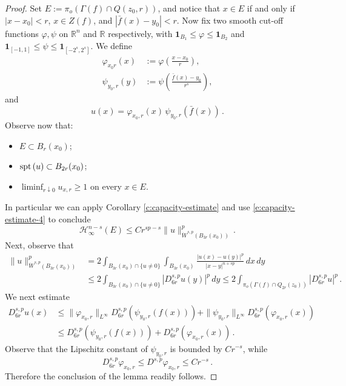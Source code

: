 \documentclass[11pt,reqno]{amsart}
\renewcommand{\H}{\mathcal{H}}
\theoremstyle{definition}
\numberwithin{equation}{section}
\begin{document}
\begin{proof}
Set $E:=\pi_o (\Gamma (f)\cap Q(z_0,r))$, and notice that $x\in E$ if and only if $|x-x_0|<r$, $x\in Z(f)$, and $|\bar{f}(x)-y_0|<r$. Now fix two smooth cut-off functions $\varphi, \psi$ on $\mathbb R^n$ and $\mathbb R$ respectively, with $\mathbf{1}_{B_1}\le\varphi\le \mathbf{1}_{B_2}$ and $\mathbf{1}_{[-1,1]} \le \psi \le\mathbf{1}_{[-2^s, 2^s]}$. We define 
\begin{align*}
\varphi_{x_0 r}(x) &:= \varphi \left(\frac{x-x_0}{r}\right),\\
\psi_{y_0,r} (y) &:= \psi \left(\frac{\bar{f}(x)-y_0}{r^s}\right),
\end{align*}
and 
\[
u(x) =\varphi_{x_0, r} (x)\, \psi_{y_0,r} (\bar{f} (x))\, .
\]
Observe now that:
\begin{itemize}
\item $E\subset B_r (x_0)$;
\item ${\rm spt}\, (u) \subset B_{2r} (x_0)$;
\item $\liminf_{r\downarrow 0} u_{x,r}\geq 1$ on every $x\in E$.
\end{itemize}
In particular we can apply Corollary \ref{c:capacity-estimate} and use \eqref{e:capacity-estimate-4} to conclude
\[
\H^{n-s}_\infty(E)\le Cr^{sp-s}\|u\|^p_{\dot{W}^{s,p}(B_{3r} (x_0))}\, .
\]
Next, observe that 
\begin{align*}
\|u\|^p_{\dot{W}^{s,p}(B_{3r}(x_0))} 
&= 2 \int_{B_{3r} (x_0) \cap \{u\neq 0\}} \int_{B_{3r} (x_0)} \frac{|u(x)-u(y)|^p}{|x-y|^{n+sp}}\, dx\, dy \\
&\leq 2 \int_{B_{3r} (x_0)\cap \{u\neq 0\}} |D^{s,p}_{6r} u (y)|^p\, dy 
\leq 2 \int_{\pi_o (\Gamma (f)\cap Q_{2r} (z_0))} |D^{s,p}_{6r} u|^p\, . 
\end{align*}
We next estimate
\begin{align*}
D^{s,p}_{6r}u(x) & \le \|\varphi_{x_0,r}\|_{L^\infty}D ^{s,p}_{6r} (\psi_{y_0,r}(f (x)))+\|\psi_{y_0,r}\|_{L^\infty} D^{s,p}_{6r}(\varphi_{x_0,r}(x))\\
& \le D^{s,p}_{6r}(\psi_{y_0,r}(f(x)))+D^{s,p}_{6r}(\varphi_{x_0,r}(x))\, .
\end{align*}
Observe that the Lipschitz constant of $\psi_{y_0,r}$ is bounded by $C r^{-s}$, while 
\[
D^{s,p}_{6r} \varphi_{x_0,r} \leq D^{s,p} \varphi_{x_0,r} \leq C r^{-s}\, .
\] 
Therefore the conclusion of the lemma readily follows.
\end{proof}
\end{document}

